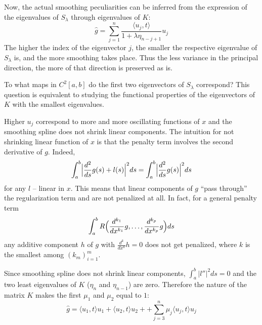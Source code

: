 \documentclass[a4paper]{article}
\begin{document}
Now, the actual smoothing peculiarities can be inferred from the expression of
the eigenvalues of $S_\lambda$ through eigenvalues of $K$:
\[
\hat{g}
= \sum_{j=1}^n \frac{ \langle u_j, t \rangle }{1 + \lambda \eta_{n-j+1}} u_j
\]
The higher the index of the eigenvector $j$, the smaller the respective eigenvalue
of $S_\lambda$ is, and the more smoothing takes place. Thus the less variance in
the principal direction, the more of that direction is preserved as is.

To what maps in $C^2[a,b]$ do the first two eigenvectors of $S_\lambda$ correspond?
This question is equivalent to studying the functional properties of the eigenvectors
of $K$ with the smallest eigenvalues.

Higher $u_j$ correspond to more and more oscillating functions of $x$ and the smoothing
spline does not shrink linear components. The intuition for not shrinking linear
function of $x$ is that the penalty term involves the second derivative of $g$. Indeed,
\[
\int_a^b \Bigl|\frac{d^2}{ds} g(s)+l(s) \Bigr|^2 ds
= \int_a^b \Bigl|\frac{d^2}{ds} g(s) \Bigr|^2 ds
\]
for any $l$ -- linear in $x$. This means that linear components of $g$ ``pass through''
the regularization term and are not penalized at all. In fact, for a general penalty
term
\[ \int_a^b R\Bigl( \frac{d^{k_1}}{dx^{k_1}} g, \ldots, \frac{d^{k_p}}{dx^{k_p}} g\Bigr) ds\]
any additive component $h$ of $g$ with $\frac{d^k}{dx^k} h = 0$ does not get penalized,
where $k$ is the smallest among $(k_m)_{i=1}^m$.

Since smoothing spline does not shrink linear components, $\int_a^b |l''|^2ds = 0$
and the two least eigenvalues of $K$ ($\eta_n$ and $\eta_{n-1}$) are zero. Therefore
the nature of the matrix $K$ makes the first $\mu_1$ and $\mu_2$ equal to $1$:
\[
\hat{g} =
\langle u_1, t \rangle u_1 + \langle u_2, t \rangle u_2 +
+ \sum_{j=3}^n \mu_j \langle u_j, t \rangle u_j
\]



\end{document}
